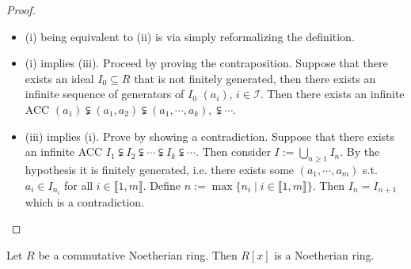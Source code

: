\begin{proof}
    \begin{itemize}
        \item (i) being equivalent to (ii) is via simply reformalizing the definition.
        \item (i) implies (iii). Proceed by proving the contraposition. Suppose that there exists an ideal $I_0 \subseteq R$ that is not finitely generated, then there exists an infinite sequence of generators of $I_0$ $(a_i)$, $i\in \mathcal{I}$. Then there exists an infinite ACC $(a_1) \subsetneqq (a_1, a_2) \subsetneqq (a_1, \cdots, a_k), \subsetneqq\cdots$. 
        \item (iii) implies (i). Prove by showing a contradiction. Suppose that there exists an infinite ACC $I_1 \subsetneqq I_2 \subsetneqq \cdots \subsetneqq I_k \subsetneqq\cdots$. Then consider $I := \bigcup_{n\geq 1} I_n$. By the hypothesis it is finitely generated, i.e. there exists some $(a_1, \cdots, a_m)$ s.t. $a_i \in I_{n_i}$ for all $i\in \llbracket 1, m \rrbracket$. Define $n := \max\{ n_i \mid i\in \llbracket 1, m \rrbracket \}$. Then $I_n = I_{n+1}$ which is a contradiction.
    \end{itemize}
\end{proof}

\begin{theorem}
    Let $R$ be a commutative Noetherian ring. Then $R[x]$ is a Noetherian ring.
\end{theorem}

